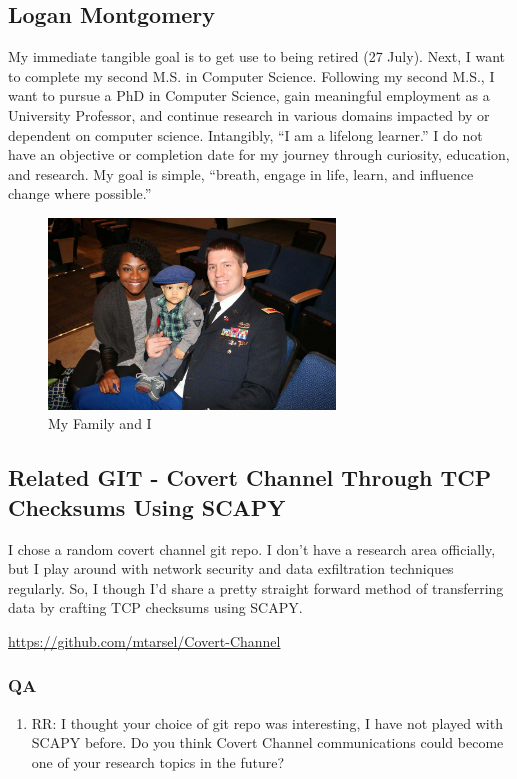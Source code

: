 \subsection{Logan Montgomery}
My immediate tangible goal is to get use to being retired (27 July).  Next, I want to complete my second M.S. in Computer Science.  Following my second M.S., I want to pursue a PhD in Computer Science, gain meaningful employment as a University Professor, and continue research in various domains impacted by or dependent on computer science.  Intangibly, “I am a lifelong learner.”  I do not have an objective or completion date for my journey through curiosity, education, and research.  My goal is simple, “breath, engage in life, learn, and influence change where possible.”

\begin{figure}[ht]
	\centering
    \includegraphics[width=3in]{myimage}
    \caption{My Family and I}
    \label{fig:My Family and I}
\end{figure}

\subsection{Related GIT - Covert Channel Through TCP Checksums Using SCAPY}
I chose a random covert channel git repo.  I don't have a research area officially, but I play around with network security and data exfiltration techniques regularly.  So, I though I'd share a pretty straight forward method of transferring data by crafting TCP checksums using SCAPY.   

\url{https://github.com/mtarsel/Covert-Channel}

\subsubsection{QA}
\begin{enumerate}

	\item RR: I thought your choice of git repo was interesting, I have not played with SCAPY before. Do you think Covert Channel communications could become one of your research topics in the future?

\end{enumerate}
